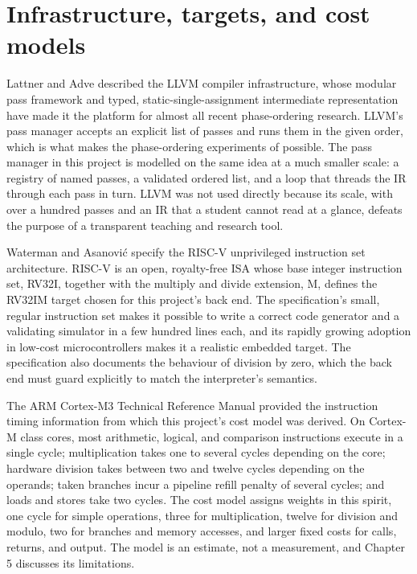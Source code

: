 \section*{Infrastructure, targets, and cost models}

Lattner and Adve \cite{lattner2004} described the LLVM compiler infrastructure, whose modular pass framework and typed, static-single-assignment intermediate representation have made it the platform for almost all recent phase-ordering research. LLVM's pass manager accepts an explicit list of passes and runs them in the given order, which is what makes the phase-ordering experiments of \cite{ashouri2017,hajali2020,jain2022,cummins2023} possible. The pass manager in this project is modelled on the same idea at a much smaller scale: a registry of named passes, a validated ordered list, and a loop that threads the IR through each pass in turn. LLVM was not used directly because its scale, with over a hundred passes and an IR that a student cannot read at a glance, defeats the purpose of a transparent teaching and research tool.

Waterman and Asanovi\'{c} \cite{waterman2019} specify the RISC-V unprivileged instruction set architecture. RISC-V is an open, royalty-free ISA whose base integer instruction set, RV32I, together with the multiply and divide extension, M, defines the RV32IM target chosen for this project's back end. The specification's small, regular instruction set makes it possible to write a correct code generator and a validating simulator in a few hundred lines each, and its rapidly growing adoption in low-cost microcontrollers makes it a realistic embedded target. The specification also documents the behaviour of division by zero, which the back end must guard explicitly to match the interpreter's semantics.

The ARM Cortex-M3 Technical Reference Manual \cite{arm2010} provided the instruction timing information from which this project's cost model was derived. On Cortex-M class cores, most arithmetic, logical, and comparison instructions execute in a single cycle; multiplication takes one to several cycles depending on the core; hardware division takes between two and twelve cycles depending on the operands; taken branches incur a pipeline refill penalty of several cycles; and loads and stores take two cycles. The cost model assigns weights in this spirit, one cycle for simple operations, three for multiplication, twelve for division and modulo, two for branches and memory accesses, and larger fixed costs for calls, returns, and output. The model is an estimate, not a measurement, and Chapter 5 discusses its limitations.

